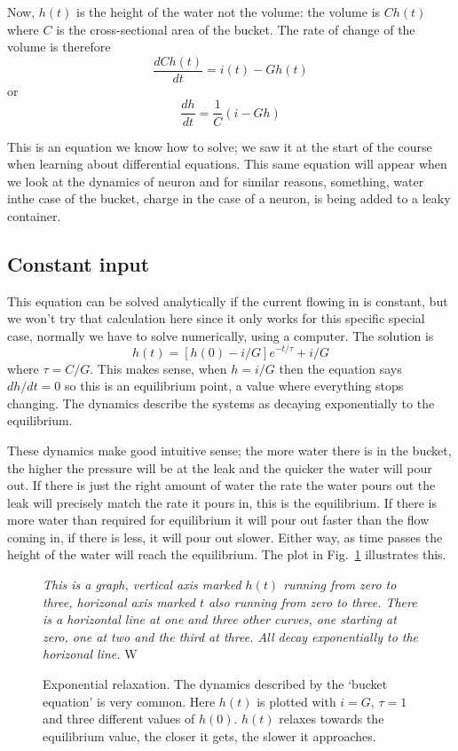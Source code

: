 \documentclass[12pt]{article}
\begin{document}
Now, $h(t)$ is the height of the water not the volume: the volume is
$Ch(t)$ where $C$ is the cross-sectional area of the bucket. The rate
of change of the volume is therefore
\begin{equation}
\frac{dCh(t)}{dt}=i(t)-Gh(t)
\end{equation}
or
\begin{equation}
\frac{dh}{dt}=\frac{1}{C}(i-Gh)
\end{equation}

This is an equation we know how to solve; we saw it at the start of
the course when learning about differential equations. This same
equation will appear when we look at the dynamics of neuron and for
similar reasons, something, water inthe case of the bucket, charge in
the case of a neuron, is being added to a leaky container.


\subsection*{Constant input}

This equation can be solved analytically if the current flowing in is
constant, but we won't try that calculation here since it only works
for this specific special case, normally we have to solve numerically,
using a computer. The solution is
\begin{equation}
h(t)=[h(0)-i/G]e^{-t/\tau}+i/G
\end{equation}
where $\tau=C/G$. This makes sense, when $h=i/G$ then the equation
says $dh/dt=0$ so this is an equilibrium point, a value where
everything stops changing. The dynamics describe the systems as
decaying exponentially to the equilibrium.

These dynamics make good intuitive sense; the more water there is in
the bucket, the higher the pressure will be at the leak and the
quicker the water will pour out. If there is just the right amount of
water the rate the water pours out the leak will precisely match the
rate it pours in, this is the equilibrium. If there is more water than
required for equilibrium it will pour out faster than the flow coming
in, if there is less, it will pour out slower. Either way, as time
passes the height of the water will reach the equilibrium. The plot in
Fig.~\ref{bucket_v} illustrates this.

\begin{figure}
  \begin{center}
    {\textsl{This is a graph, vertical
      axis marked $h(t)$ running from zero to three, horizonal axis
      marked $t$ also running from zero to three. There is a
      horizontal line at one and three other curves, one starting at zero, one at two and the third at three. All decay exponentially to the horizonal line. }}W
{}
\end{center}
\caption{Exponential relaxation. The dynamics described by the
  \lq{}bucket equation\rq{} is very common. Here
  $h(t)$ is plotted with
  $i=G$, $\tau=1$ and three different values of
  $h(0)$. $h(t)$ relaxes towards the equilibrium value, the closer it gets, the slower it approaches.\label{bucket_v}}
\end{figure}
\end{document}
